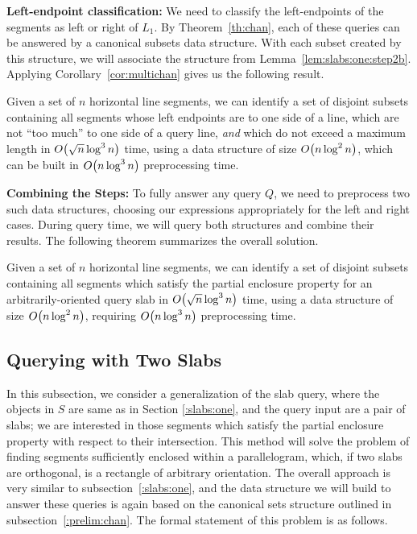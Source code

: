 {\bf Left-endpoint classification:}
We need to classify the left-endpoints of the segments as left or right of $L_1$. 
By Theorem~\ref{th:chan}, each of these queries can be answered by a canonical subsets data structure.
With each subset created by this structure, we will associate the structure from Lemma~\ref{lem:slabs:one:step2b}. 
Applying Corollary~\ref{cor:multichan} gives us the following result.

\begin{lemma}
\label{lem:slabs:one:step3}
Given a set of $n$ horizontal line segments, we can identify a set of disjoint subsets containing all segments whose left endpoints are to one side of a line, which are not ``too much'' to one side of a query line, \emph{and} which do not exceed a maximum length in $O\!\left(\sqrt{n}\log^3{n}\right)$ time, using a data structure of size $O\!\left(n\log^2{n}\right)$, which can be built in $O\!\left(n\log^3{n}\right)$ preprocessing time.
\end{lemma}


{\bf Combining the Steps:}
To fully answer any query $Q$, we need to preprocess two such data structures, choosing our expressions appropriately for the left and right cases.
During query time, we will query both structures and combine their results.
The following theorem summarizes the overall solution.

\begin{theorem}
\label{th:slabs:one}
Given a set of $n$ horizontal line segments, we can identify a set of disjoint subsets containing all segments which satisfy the partial enclosure property for an arbitrarily-oriented query slab in $O\!\left(\sqrt{n}\log^3{n}\right)$ time, using a data structure of size $O\!\left(n\log^2{n}\right)$, requiring $O\!\left(n\log^3{n}\right)$ preprocessing time.
\end{theorem}


\subsection{Querying with Two Slabs}
\label{:slabs:two}

In this subsection, we consider a generalization of the slab query, where 
the objects in $S$ are same as in Section \ref{:slabs:one}, and the  
query input are a pair of slabs; we are interested in those segments 
which satisfy the partial enclosure property with respect to their intersection.
This method will solve the problem of finding segments sufficiently enclosed within a 
parallelogram, which, if two slabs are orthogonal, is a rectangle of arbitrary 
orientation.  
The overall approach is very similar to subsection~\ref{:slabs:one}, and the data structure we will build to answer these queries is again based on the canonical sets structure outlined in subsection~\ref{:prelim:chan}.
The formal statement of this problem is as follows.

